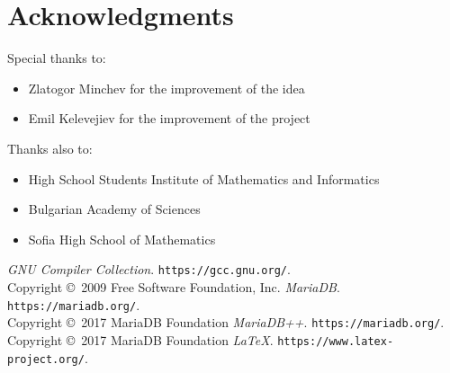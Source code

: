 \documentclass[a4paper, 12pt]{article}
\begin{document}
 	\section{Acknowledgments}
 	 	 Special thanks to:
 	 	 \begin{itemize}
 	 	 	\item Zlatogor Minchev for the improvement of the idea
 	 	 	\item Emil Kelevejiev for the improvement of the project
 	 	 \end{itemize}
 	 	 Thanks also to:
 	 	 \begin{itemize}
 	 	 	\item High School Students Institute of Mathematics and Informatics
 	 	 	\item Bulgarian Academy of Sciences
 	 	 	\item Sofia High School of Mathematics
 	 	 \end{itemize}
 	 	 \begin{thebibliography}{99}
 	 	 	{\itshape GNU Compiler Collection}.
 	 	 	\texttt{https://gcc.gnu.org/}. \\
 	 	 	Copyright \copyright\  2009 Free Software Foundation, Inc.
 	 	 	{\itshape MariaDB}.
 	 	 	\texttt{https://mariadb.org/}. \\
 	 	 	Copyright \copyright\  2017 MariaDB Foundation
 	 	 	{\itshape MariaDB++}.
 	 	 	\texttt{https://mariadb.org/}. \\
 	 	 	Copyright \copyright\  2017 MariaDB Foundation
 	 	 	{\itshape \LaTeX}.
 	 	 	\texttt{https://www.latex-project.org/}.
 	 	 \end{thebibliography}
\end{document}
